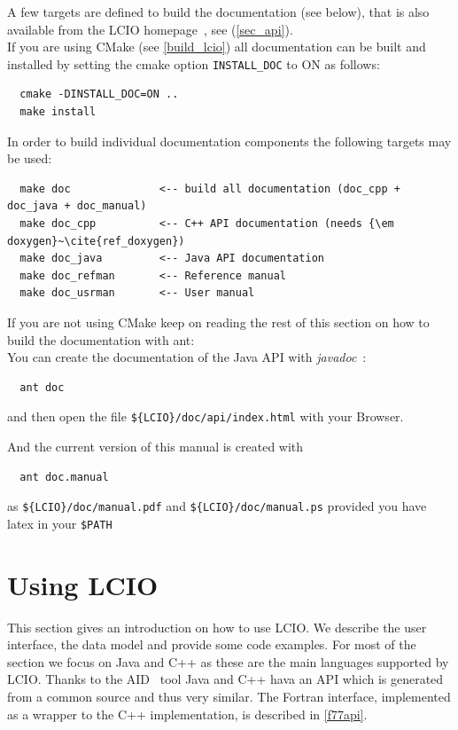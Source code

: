 \documentclass[twoside]{article}
\begin{document}
A few targets are defined to build the documentation (see below), that is also available
from the LCIO homepage~\cite{lcio_home}, see (\ref{sec_api}).\\

If you are using CMake (see \ref{build_lcio}) all documentation can be built and installed
by setting the cmake option  \verb|INSTALL_DOC| to ON as follows:
\begin{verbatim}
  cmake -DINSTALL_DOC=ON ..
  make install
\end{verbatim}

In order to build individual documentation components the following targets may be used:
\begin{verbatim}
  make doc              <-- build all documentation (doc_cpp + doc_java + doc_manual)
  make doc_cpp          <-- C++ API documentation (needs {\em doxygen}~\cite{ref_doxygen})
  make doc_java         <-- Java API documentation
  make doc_refman       <-- Reference manual
  make doc_usrman       <-- User manual
\end{verbatim}

If you are not using CMake keep on reading the rest of this section on how to build
the documentation with ant:\\

You can create the documentation of the Java API with {\em javadoc}~\cite{ref_javadoc}:
\begin{verbatim}
  ant doc 
\end{verbatim}
and then open the file \verb|${LCIO}/doc/api/index.html| with your Browser. %

\vspace{\baselineskip}
And the current version of this manual is created with
\begin{verbatim}
  ant doc.manual
\end{verbatim}
as \verb|${LCIO}/doc/manual.pdf| and \verb|${LCIO}/doc/manual.ps| provided you have latex in your 
\verb|$PATH| %

\section{Using LCIO}
This section gives an introduction on how to use LCIO. We describe the user interface, the data model and
provide some code examples. For most of the section we focus on Java and C++ as these are the main 
languages supported by LCIO. Thanks to the AID~\cite{ref_aid} tool Java and C++ hava an API which is generated
from a common source and thus very similar.
The Fortran interface, implemented as a wrapper to the C++ implementation, is described 
in \ref{f77api}. 
\end{document}
